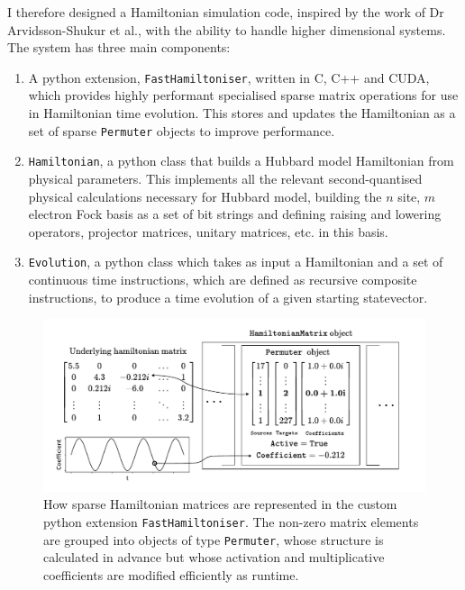 \documentclass{report}
\begin{document}
\begin{appendices}
I therefore designed a Hamiltonian simulation code, inspired by the work of Dr Arvidsson-Shukur et al., with the ability to handle higher dimensional systems. The system has three main components: 
\begin{enumerate}
    \item A python extension, \texttt{FastHamiltoniser}, written in C, C++ and CUDA, which provides highly performant specialised sparse matrix operations for use in Hamiltonian time evolution. This stores and updates the Hamiltonian as a set of sparse \texttt{Permuter} objects to improve performance.
    \item \texttt{Hamiltonian}, a python class that builds a Hubbard model Hamiltonian from physical parameters. This implements all the relevant second-quantised physical calculations necessary for Hubbard model, building the $n$ site, $m$ electron Fock basis as a set of bit strings and defining raising and lowering operators, projector matrices, unitary matrices, etc. in this basis.
    \item \texttt{Evolution}, a python class which takes as input a Hamiltonian and a set of continuous time instructions, which are defined as recursive composite instructions, to produce a time evolution of a given starting statevector.
\end{enumerate}

\begin{figure}[ht]
    \centering
    \includegraphics[scale = 0.8]{Figures/fasthamiltoniser/diagram.pdf}
    \caption{How sparse Hamiltonian matrices are represented in the custom python extension \texttt{FastHamiltoniser}. The non-zero matrix elements are grouped into objects of type \texttt{Permuter}, whose structure is calculated in advance but whose activation and multiplicative coefficients are modified efficiently as runtime.}
    \label{fig:fasthamiltoniser}
\end{figure}

\end{appendices}
\end{document}
